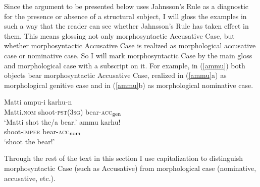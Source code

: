 \documentclass[output=paper,
modfonts
]{LSP/langsci}
\newcommand{\rf}[1]{(\ref{#1})}
\newcommand{\rfa}[2]{(\ref{#1}{#2})}
\def\trf#1{$_{\textrm{\scriptsize{#1}}}$}
\begin{document}
Since the argument to be presented below uses Jahnsson's Rule as a diagnostic for the presence
or absence of a structural subject, I will gloss the examples in such a way that the reader can
see whether Jahnsson's Rule has taken effect in them.  This means glossing not only
morphosyntactic Accusative Case, but whether morphosyntactic Accusative Case is realized as
morphological accusative case or nominative case. So I will mark morphosyntactic Case by the
main gloss and morphological case with a subscript on it.  For example, in \rf{ammu} both
objects bear morphosyntactic Accusative Case, realized in \rfa{ammu}{a} as morphological
genitive case and in \rfa{ammu}{b} as morphological nominative case.
\begin{exe}
\ex\label{ammu}
	\ea \gll Matti ampu-i karhu-n \\
		Matti.\textsc{nom} shoot-\textsc{pst}(\textsc{3sg}) bear-\textsc{acc\trf{gen}}\\
		\glt `Matti shot the/a bear.' 
	\ex \gll ammu karhu! \\
		shoot-\textsc{imper} bear-\textsc{acc\trf{nom}}\\
		\glt `shoot the bear!'
	\z
\end{exe}
Through the rest of the text in this section I use capitalization to distinguish
morphosyntactic Case (such as Accusative) from morphological case (nominative, accusative,
etc.).
\end{document}
